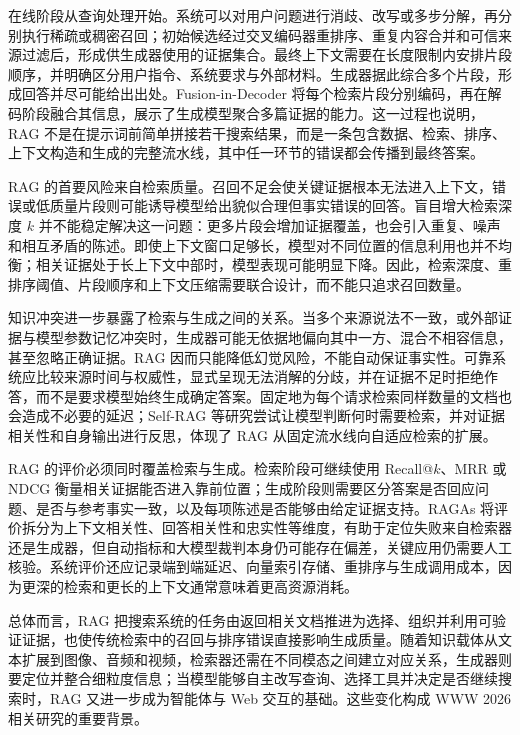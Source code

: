 在线阶段从查询处理开始。系统可以对用户问题进行消歧、改写或多步分解，再分别执行稀疏或稠密召回；初始候选经过交叉编码器重排序、重复内容合并和可信来源过滤后，形成供生成器使用的证据集合。最终上下文需要在长度限制内安排片段顺序，并明确区分用户指令、系统要求与外部材料。生成器据此综合多个片段，形成回答并尽可能给出出处。Fusion-in-Decoder 将每个检索片段分别编码，再在解码阶段融合其信息，展示了生成模型聚合多篇证据的能力\parencite{izacard2021fid}。这一过程也说明，RAG 不是在提示词前简单拼接若干搜索结果，而是一条包含数据、检索、排序、上下文构造和生成的完整流水线，其中任一环节的错误都会传播到最终答案。

RAG 的首要风险来自检索质量。召回不足会使关键证据根本无法进入上下文，错误或低质量片段则可能诱导模型给出貌似合理但事实错误的回答。盲目增大检索深度 $k$ 并不能稳定解决这一问题：更多片段会增加证据覆盖，也会引入重复、噪声和相互矛盾的陈述。即使上下文窗口足够长，模型对不同位置的信息利用也并不均衡；相关证据处于长上下文中部时，模型表现可能明显下降\parencite{liu2024lost}。因此，检索深度、重排序阈值、片段顺序和上下文压缩需要联合设计，而不能只追求召回数量。

知识冲突进一步暴露了检索与生成之间的关系。当多个来源说法不一致，或外部证据与模型参数记忆冲突时，生成器可能无依据地偏向其中一方、混合不相容信息，甚至忽略正确证据。RAG 因而只能降低幻觉风险，不能自动保证事实性。可靠系统应比较来源时间与权威性，显式呈现无法消解的分歧，并在证据不足时拒绝作答，而不是要求模型始终生成确定答案。固定地为每个请求检索同样数量的文档也会造成不必要的延迟；Self-RAG 等研究尝试让模型判断何时需要检索，并对证据相关性和自身输出进行反思\parencite{asai2024selfrag}，体现了 RAG 从固定流水线向自适应检索的扩展。

RAG 的评价必须同时覆盖检索与生成。检索阶段可继续使用 Recall@$k$、MRR 或 NDCG 衡量相关证据能否进入靠前位置；生成阶段则需要区分答案是否回应问题、是否与参考事实一致，以及每项陈述是否能够由给定证据支持。RAGAs 将评价拆分为上下文相关性、回答相关性和忠实性等维度\parencite{es2024ragas}，有助于定位失败来自检索器还是生成器，但自动指标和大模型裁判本身仍可能存在偏差，关键应用仍需要人工核验。系统评价还应记录端到端延迟、向量索引存储、重排序与生成调用成本，因为更深的检索和更长的上下文通常意味着更高资源消耗。

总体而言，RAG 把搜索系统的任务由返回相关文档推进为选择、组织并利用可验证证据，也使传统检索中的召回与排序错误直接影响生成质量。随着知识载体从文本扩展到图像、音频和视频，检索器还需在不同模态之间建立对应关系，生成器则要定位并整合细粒度信息；当模型能够自主改写查询、选择工具并决定是否继续搜索时，RAG 又进一步成为智能体与 Web 交互的基础。这些变化构成 WWW 2026 相关研究的重要背景。

